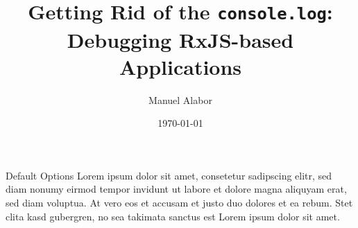 \documentclass[aspectratio=169]{beamer}
\title[Debugging RxJS-based Applications]{Getting Rid of the \texttt{console.log}:\\Debugging RxJS-based Applications}
\author{Manuel Alabor}
\institute{Eastern Switzerland University of Applied Sciences}
\date{\today}
\begin{document}
  \begin{frame}{Default Options}
    Lorem ipsum dolor sit amet, consetetur sadipscing elitr,
    sed diam nonumy eirmod tempor invidunt ut labore et dolore
    magna aliquyam erat, sed diam voluptua.
    At vero eos et accusam et justo duo dolores et ea rebum.
    Stet clita kasd gubergren, no sea takimata sanctus est
    Lorem ipsum dolor sit amet.
  \end{frame}
\end{document}
